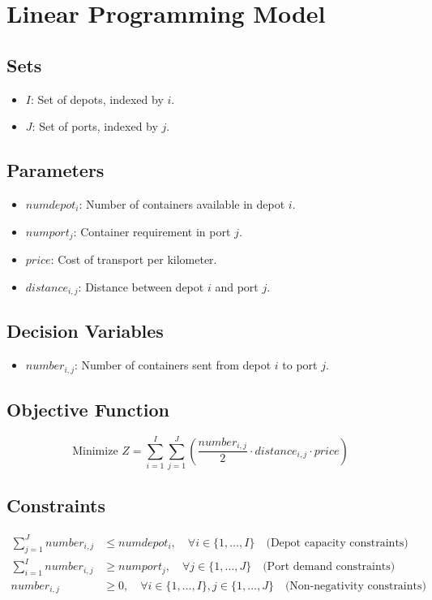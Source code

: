 \documentclass{article}
\begin{document}
\section*{Linear Programming Model}

\subsection*{Sets}
\begin{itemize}
    \item $I$: Set of depots, indexed by $i$.
    \item $J$: Set of ports, indexed by $j$.
\end{itemize}

\subsection*{Parameters}
\begin{itemize}
    \item $numdepot_i$: Number of containers available in depot $i$.
    \item $numport_j$: Container requirement in port $j$.
    \item $price$: Cost of transport per kilometer.
    \item $distance_{i,j}$: Distance between depot $i$ and port $j$.
\end{itemize}

\subsection*{Decision Variables}
\begin{itemize}
    \item $number_{i,j}$: Number of containers sent from depot $i$ to port $j$.
\end{itemize}

\subsection*{Objective Function}
\[
\text{Minimize } Z = \sum_{i=1}^{I} \sum_{j=1}^{J} \left( \frac{number_{i,j}}{2} \cdot distance_{i,j} \cdot price \right)
\]

\subsection*{Constraints}
\begin{align}
\sum_{j=1}^{J} number_{i,j} & \leq numdepot_i, \quad \forall i \in \{1, \ldots, I\} \quad \text{(Depot capacity constraints)} \\
\sum_{i=1}^{I} number_{i,j} & \geq numport_j, \quad \forall j \in \{1, \ldots, J\} \quad \text{(Port demand constraints)} \\
number_{i,j} & \geq 0, \quad \forall i \in \{1, \ldots, I\}, j \in \{1, \ldots, J\} \quad \text{(Non-negativity constraints)}
\end{align}
\end{document}
